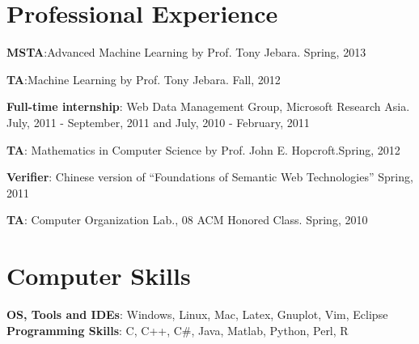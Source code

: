 \documentclass[margin,line]{res}
\newenvironment{list1}{
  \begin{list}{\ding{113}}{%
      \setlength{\itemsep}{0in}
      \setlength{\parsep}{0in} \setlength{\parskip}{0in}
      \setlength{\topsep}{0in} \setlength{\partopsep}{0in} 
      \setlength{\leftmargin}{0.17in}}}{\end{list}}
\begin{document}
\begin{resume}
\section{\sc Professional Experience}
\begin{list1}
\item[] {\bf MSTA}:Advanced Machine Learning by Prof. Tony Jebara. \hfill{Spring, 2013}
\item[] {\bf TA}:Machine Learning by Prof. Tony Jebara. \hfill{Fall, 2012}
\item[] {\bf Full-time internship}: Web Data Management Group, Microsoft Research Asia. \hfill { July, 2011 - September, 2011 and July, 2010 - February, 2011}
\item[] {\bf TA}: Mathematics in Computer Science by Prof. John E. Hopcroft.\hfill {Spring, 2012}
\item[] {\bf Verifier}: Chinese version of ``Foundations of Semantic Web Technologies'' \hfill {Spring, 2011}
\item[] {\bf TA}: Computer Organization Lab., 08 ACM Honored Class. \hfill {Spring, 2010}
\end{list1}

\section{\sc Computer Skills} 
{\bf OS, Tools and IDEs}: Windows, Linux, Mac, Latex, Gnuplot, Vim, Eclipse\\
{\bf Programming Skills}: C, C++, C\#, Java, Matlab, Python, Perl, R

\end{resume}
\end{document}
